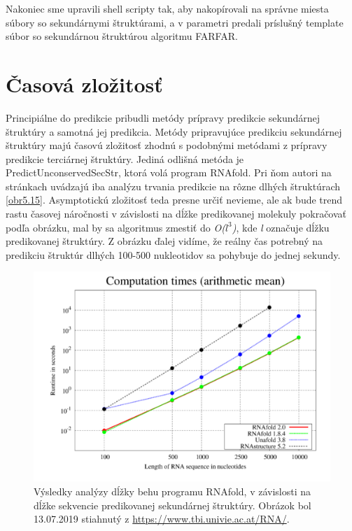 \indent Nakoniec sme upravili shell scripty tak, aby nakopírovali na správne miesta súbory so sekundárnymi štruktúrami, a v parametri predali príslušný template súbor so sekundárnou štruktúrou algoritmu FARFAR.


\section{Časová zložitosť}
Principiálne do predikcie pribudli metódy prípravy predikcie sekundárnej štruktúry a samotná jej predikcia. Metódy pripravujúce predikciu sekundárnej štruktúry majú časovú zložitosť zhodnú s podobnými metódami z prípravy predikcie terciárnej štruktúry. Jediná odlišná metóda je PredictUnconservedSecStr, ktorá volá program RNAfold. Pri ňom autori na stránkach uvádzajú iba analýzu trvania predikcie na rôzne dlhých štruktúrach \autoref{obr5.15}. Asymptotickú zložitosť teda presne určiť nevieme, ale ak bude trend rastu časovej náročnosti v závislosti na dĺžke predikovanej molekuly pokračovať podľa obrázku, mal by sa algoritmus zmestiť do \textit{O($l^3$)}, kde \textit{l} označuje dĺžku predikovanej štruktúry. Z obrázku ďalej vidíme, že reálny čas potrebný na predikciu štruktúr dlhých 100-500 nukleotidov sa pohybuje do jednej sekundy. 

\begin{figure}%
\includegraphics[width=\textwidth]{../img/rnafold}
\caption{Výsledky analýzy dĺžky behu programu RNAfold, v závislosti na dĺžke sekvencie predikovanej sekundárnej štruktúry. Obrázok bol 13.07.2019 stiahnutý z \url{https://www.tbi.univie.ac.at/RNA/}.}
\label{obr5.15}
\end{figure}


